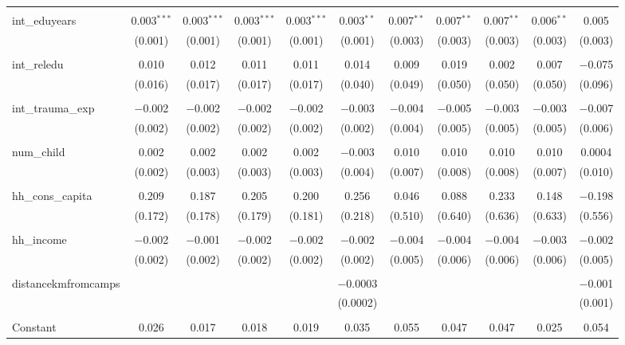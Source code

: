 \begin{table}[H]
\begin{tabular}{@{\extracolsep{4pt}}lcccccccccc}
  & & & & & & & & & & \\ 
 int\_eduyears & 0.003$^{***}$ & 0.003$^{***}$ & 0.003$^{***}$ & 0.003$^{***}$ & 0.003$^{**}$ & 0.007$^{**}$ & 0.007$^{**}$ & 0.007$^{**}$ & 0.006$^{**}$ & 0.005 \\ 
  & (0.001) & (0.001) & (0.001) & (0.001) & (0.001) & (0.003) & (0.003) & (0.003) & (0.003) & (0.003) \\ 
  & & & & & & & & & & \\ 
 int\_reledu & 0.010 & 0.012 & 0.011 & 0.011 & 0.014 & 0.009 & 0.019 & 0.002 & 0.007 & $-$0.075 \\ 
  & (0.016) & (0.017) & (0.017) & (0.017) & (0.040) & (0.049) & (0.050) & (0.050) & (0.050) & (0.096) \\ 
  & & & & & & & & & & \\ 
 int\_trauma\_exp & $-$0.002 & $-$0.002 & $-$0.002 & $-$0.002 & $-$0.003 & $-$0.004 & $-$0.005 & $-$0.003 & $-$0.003 & $-$0.007 \\ 
  & (0.002) & (0.002) & (0.002) & (0.002) & (0.002) & (0.004) & (0.005) & (0.005) & (0.005) & (0.006) \\ 
  & & & & & & & & & & \\ 
 num\_child & 0.002 & 0.002 & 0.002 & 0.002 & $-$0.003 & 0.010 & 0.010 & 0.010 & 0.010 & 0.0004 \\ 
  & (0.002) & (0.003) & (0.003) & (0.003) & (0.004) & (0.007) & (0.008) & (0.008) & (0.007) & (0.010) \\ 
  & & & & & & & & & & \\ 
 hh\_cons\_capita & 0.209 & 0.187 & 0.205 & 0.200 & 0.256 & 0.046 & 0.088 & 0.233 & 0.148 & $-$0.198 \\ 
  & (0.172) & (0.178) & (0.179) & (0.181) & (0.218) & (0.510) & (0.640) & (0.636) & (0.633) & (0.556) \\ 
  & & & & & & & & & & \\ 
 hh\_income & $-$0.002 & $-$0.001 & $-$0.002 & $-$0.002 & $-$0.002 & $-$0.004 & $-$0.004 & $-$0.004 & $-$0.003 & $-$0.002 \\ 
  & (0.002) & (0.002) & (0.002) & (0.002) & (0.002) & (0.005) & (0.006) & (0.006) & (0.006) & (0.005) \\ 
  & & & & & & & & & & \\ 
 distancekmfromcamps &  &  &  &  & $-$0.0003 &  &  &  &  & $-$0.001 \\ 
  &  &  &  &  & (0.0002) &  &  &  &  & (0.001) \\ 
  & & & & & & & & & & \\ 
 Constant & 0.026 & 0.017 & 0.018 & 0.019 & 0.035 & 0.055 & 0.047 & 0.047 & 0.025 & 0.054 \\ 

\end{tabular}
\end{table}

